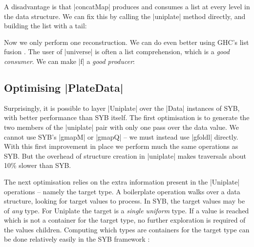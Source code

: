 A disadvantage is that |concatMap| produces and consumes a list at every level in the data structure. We can fix this by calling the |uniplate| method directly, and building the list with a tail:


Now we only perform one reconstruction. We can do even better using GHC's list fusion \cite{spj:rules}. The user of |universe| is often a list comprehension, which is a \textit{good consumer}. We can make |f| a \textit{good producer}:


\subsection{Optimising |PlateData|}
\label{secU:optimise_playdata}

Surprisingly, it is possible to layer |Uniplate| over the |Data| instances of SYB, with better performance than SYB itself. The first optimisation is to generate the two members of the |uniplate| pair with only one pass over the data value. We cannot use SYB's |gmapM| or |gmapQ| -- we must instead use |gfoldl| directly. With this first improvement in place we perform much the same operations as SYB. But the overhead of structure creation in |uniplate| makes traversals about 10\% slower than SYB.

The next optimisation relies on the extra information present in the |Uniplate| operations -- namely the target type. A boilerplate operation walks over a data structure, looking for target values to process. In SYB, the target values may be of \textit{any} type. For Uniplate the target is a \textit{single uniform} type. If a value is reached which is not a container for the target type, no further exploration is required of the values children. Computing which types are containers for the target type can be done relatively easily in the SYB framework \citep{lammel:syb2}:

